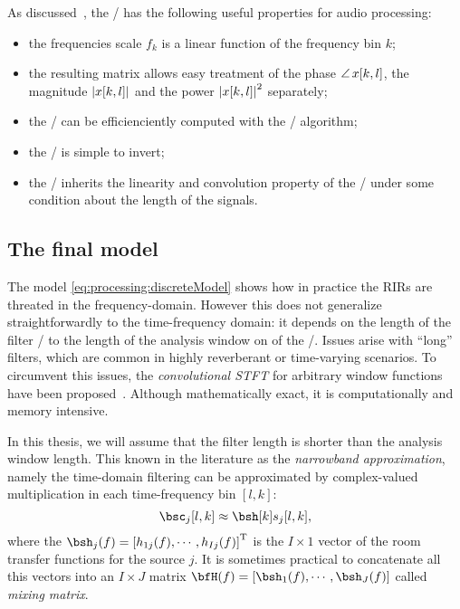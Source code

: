 As discussed~, the \STFT/ has the following useful properties for audio processing:
\begin{itemize}
    \item the frequencies scale $f_k$ is a linear function of the frequency bin $k$;
    \item the resulting matrix allows easy treatment of the phase $\operatorname*{\angle}{x[k,l]}$, the magnitude $\magnitudeOf{x[k,l]}$ and the power $\powerOf{x[k,l]}$ separately;
    \item the \DFT/ can be efficienciently computed with the \FFT/ algorithm;
    \item the \STFT/ is simple to invert;
    \item the \STFT/ inherits the linearity and convolution property of the \DFT/ under some condition about the length of the signals.
\end{itemize}

\subsection{The final model}
The model \eqref{eq:processing:discreteModel} shows how in practice the RIRs are threated in the frequency-domain.
However this does not generalize straightforwardly to the time-frequency domain:
it depends on the length of the filter \wrt/ to the length of the analysis window on of the \STFT/.
Issues arise with ``long'' filters, which are common in highly reverberant or time-varying scenarios.
To circumvent this issues, the \textit{convolutional STFT} for arbitrary window functions have been proposed~.
Although mathematically exact, it is computationally and memory intensive.

In this thesis, we will assume that the filter length is shorter than the analysis window length.
This known in the literature as the \textit{narrowband approximation}, namely the time-domain filtering can be approximated by complex-valued multiplication in each time-frequency bin $[l,k]$:
\begin{equation}
    \imgs_j[l,k] \approx \bsh[k] \src_j[l,k]
    ,
\end{equation}
where the $\bsh_j(f) = \ktranspose{\klist{h_{1j}(f), \cdots, h_{Ij}(f)}}$ is the $I \times 1$ vector of the room transfer functions for the source $j$.
It is sometimes practical to concatenate all this vectors into an $I \times J$ matrix $\bfH(f) = \klist{\bsh_1(f),\cdots,\bsh_J(f)}$ called \textit{mixing matrix}.

